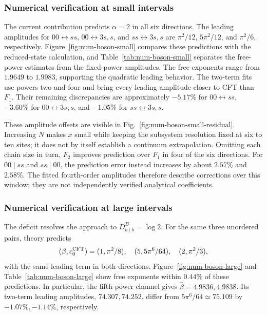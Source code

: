 \subsubsection{Numerical verification at small intervals}
\label{sec:num-boson-small}
The current contribution predicts $\alpha=2$ in all six directions.
The leading amplitudes for $00\leftrightarrow ss$,
$00\leftrightarrow3s,s$, and $ss\leftrightarrow3s,s$ are
$\pi^2/12$, $5\pi^2/12$, and $\pi^2/6$, respectively.
Figure~\ref{fig:num-boson-small} compares these predictions with the
reduced-state calculation, and Table~\ref{tab:num-boson-small}
separates the free-power estimates from the fixed-power amplitudes.
The free exponents range from $1.9649$ to $1.9983$, supporting the
quadratic leading behavior. The two-term fits use powers two and
four and bring every leading amplitude closer to CFT than $F_1$.
Their remaining discrepancies are approximately $-5.17\%$ for
$00\leftrightarrow ss$, $-3.60\%$ for $00\leftrightarrow3s,s$, and
$-1.05\%$ for $ss\leftrightarrow3s,s$.

These amplitude offsets are visible in
Fig.~\ref{fig:num-boson-small-residual}. Increasing $N$ makes $x$
small while keeping the subsystem resolution fixed at six to ten
sites; it does not by itself establish a continuum extrapolation.
Omitting each chain size in turn, $F_2$ improves prediction over
$F_1$ in four of the six directions. For $00\mid ss$ and
$ss\mid00$, the prediction error instead increases by about
$2.57\%$ and $2.58\%$. The fitted fourth-order amplitudes therefore
describe corrections over this window; they are not independently
verified analytical coefficients.


\clearpage

\subsubsection{Numerical verification at large intervals}
\label{sec:num-boson-large}
The deficit resolves the approach to $D^B_{a\mid b}=\log2$.
For the same three unordered pairs, theory predicts
\begin{equation}
 (\beta,c_0^{\rm CFT})=
 (1,\pi^2/8),\quad (5,5\pi^6/64),\quad (2,\pi^2/3),
 \label{eq:num-boson-large-leading}
\end{equation}
with the same leading term in both directions.
Figure~\ref{fig:num-boson-large} and
Table~\ref{tab:num-boson-large} show free exponents within
$0.44\%$ of these predictions. In particular, the fifth-power
channel gives $\widehat\beta=4.9836,4.9838$. Its two-term leading
amplitudes, $74.307,74.252$, differ from $5\pi^6/64\simeq75.109$
by $-1.07\%,-1.14\%$, respectively.

